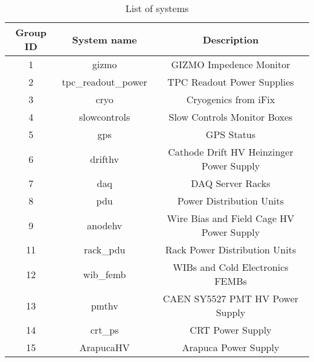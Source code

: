 
\begin{table}[ptb]
\centering
\begin{tabular}{c | c c}
\hline
Group ID & System name & Description \\ 

\hline
1 & gizmo & GIZMO Impedence Monitor\\ 
2 & tpc\_readout\_power & TPC Readout Power Supplies\\ 
3 & cryo & Cryogenics from iFix\\ 
4 & slowcontrols & Slow Controls Monitor Boxes\\ 
5 & gps & GPS Status\\ 
6 & drifthv & Cathode Drift HV Heinzinger Power Supply\\ 
7 & daq & DAQ Server Racks\\ 
8 & pdu & Power Distribution Units\\ 
9 & anodehv & Wire Bias and Field Cage HV Power Supply\\ 
11 & rack\_pdu & Rack Power Distribution Units\\ 
12 & wib\_femb & WIBs and Cold Electronics FEMBs\\ 
13 & pmthv & CAEN SY5527 PMT HV Power Supply\\ 
14 & crt\_ps & CRT Power Supply\\ 
15 & ArapucaHV & Arapuca Power Supply\\ 

\hline
\end{tabular}
\caption{List of systems}
\label{tab:system_list}
\end{table}

